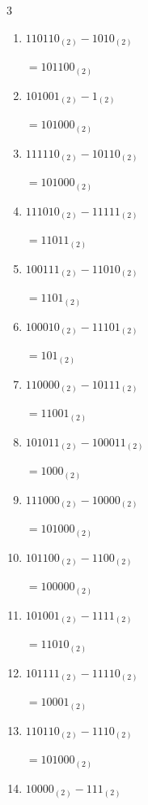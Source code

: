 \begin{multicols}{3}
\begin{enumerate}
        $=10100_{(2)}$

  \item $110110_{(2)} - 1010_{(2)}$

        $=101100_{(2)}$

\columnbreak %

  \item $101001_{(2)} - 1_{(2)}$

        $=101000_{(2)}$

  \item $111110_{(2)} - 10110_{(2)}$

        $=101000_{(2)}$

  \item $111010_{(2)} - 11111_{(2)}$

        $=11011_{(2)}$

  \item $100111_{(2)} - 11010_{(2)}$

        $=1101_{(2)}$

  \item $100010_{(2)} - 11101_{(2)}$

        $=101_{(2)}$

  \item $110000_{(2)} - 10111_{(2)}$

        $=11001_{(2)}$

  \item $101011_{(2)} - 100011_{(2)}$

        $=1000_{(2)}$

  \item $111000_{(2)} - 10000_{(2)}$

        $=101000_{(2)}$

  \item $101100_{(2)} - 1100_{(2)}$

        $=100000_{(2)}$

  \item $101001_{(2)} - 1111_{(2)}$

        $=11010_{(2)}$

\columnbreak %

\resetques

  \item $101111_{(2)} - 11110_{(2)}$

        $=10001_{(2)}$

  \item $110110_{(2)} - 1110_{(2)}$

        $=101000_{(2)}$

  \item $10000_{(2)} - 111_{(2)}$


\end{enumerate}
\end{multicols}
